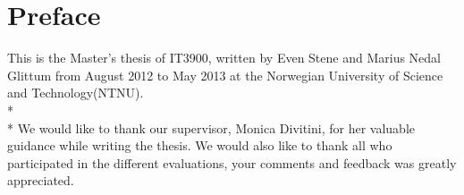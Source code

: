 \section*{Preface}
This is the Master's thesis of IT3900, written by Even Stene and Marius Nedal Glittum from August 2012 to May 2013 at the Norwegian University of Science and Technology(NTNU). \\*
\\*
We would like to thank our supervisor, Monica Divitini, for her valuable guidance while writing the thesis. We would also like to thank all who participated in the different evaluations, your comments and feedback was greatly appreciated.

\vspace{5cm}
\makebox[\textwidth][l]{
\makebox[4cm][l] {\hrulefill} \hfill 
\makebox[4cm][l] {\hrulefill} 
}

\newpage